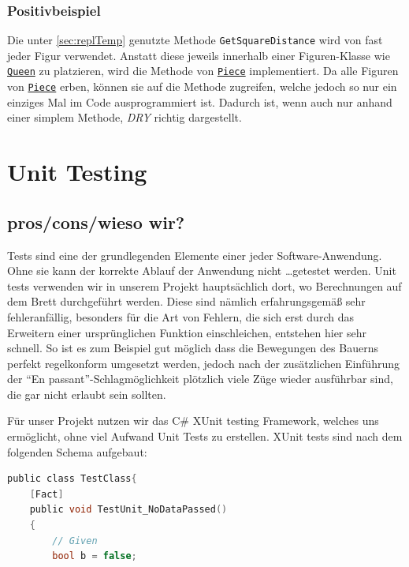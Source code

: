 \documentclass[
10pt, %
a4paper, %
oneside, %
headinclude,footinclude, %
BCOR5mm, %
]{scrartcl}
\begin{document}
\begin{onehalfspace}
\subsubsection{Positivbeispiel}
Die unter \autoref{sec:replTemp} genutzte Methode \texttt{GetSquareDistance} wird von fast jeder Figur verwendet. Anstatt diese jeweils innerhalb einer Figuren-Klasse wie \texttt{\href{https://github.com/schmida736/Chess-AdvancedSE/blob/main/Chess-AdvancedSE/Game\%20Elements/Pieces/Queen.cs}{Queen}} zu platzieren, wird die Methode von \texttt{\href{https://github.com/schmida736/Chess-AdvancedSE/blob/main/Chess-AdvancedSE/Game\%20Elements/Pieces/Piece.cs}{Piece}} implementiert. Da alle Figuren von \texttt{\href{https://github.com/schmida736/Chess-AdvancedSE/blob/main/Chess-AdvancedSE/Game\%20Elements/Pieces/Piece.cs}{Piece}} erben, können sie auf die Methode zugreifen, welche jedoch so nur ein einziges Mal im Code ausprogrammiert ist. Dadurch ist, wenn auch nur anhand einer simplem Methode, \textit{DRY} richtig dargestellt.
\newpage
\section{Unit Testing}
\subsection{pros/cons/wieso wir?}
Tests sind eine der grundlegenden Elemente einer jeder Software-Anwendung. Ohne sie kann der korrekte Ablauf der Anwendung nicht \dots getestet werden. Unit tests verwenden wir in unserem Projekt hauptsächlich dort, wo Berechnungen auf dem Brett durchgeführt werden. Diese sind nämlich erfahrungsgemäß sehr fehleranfällig, besonders für die Art von Fehlern, die sich erst durch das Erweitern einer ursprünglichen Funktion einschleichen, entstehen hier sehr schnell. So ist es zum Beispiel gut möglich dass die Bewegungen des Bauerns perfekt regelkonform umgesetzt werden, jedoch nach der zusätzlichen Einführung der \enquote{En passant}-Schlagmöglichkeit plötzlich viele Züge wieder ausführbar sind, die gar nicht erlaubt sein sollten.

Für unser Projekt nutzen wir das C\# XUnit testing Framework, welches uns ermöglicht, ohne viel Aufwand Unit Tests zu erstellen.
XUnit tests sind nach dem folgenden Schema aufgebaut:
\begin{lstlisting}[language=c, style=mStyle]
public class TestClass{
	[Fact]
	public void TestUnit_NoDataPassed()
	{
		// Given
		bool b = false;


\end{lstlisting}
\end{onehalfspace}
\end{document}
